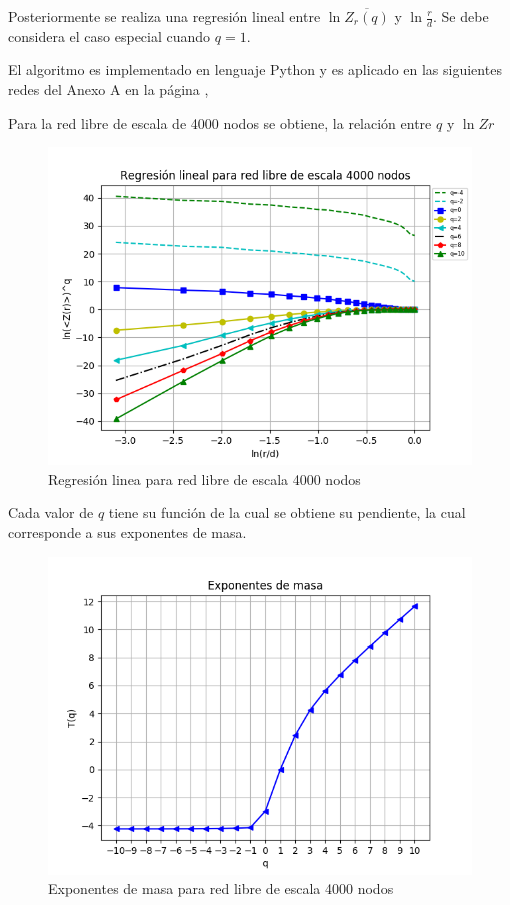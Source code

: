 Posteriormente se realiza una regresión lineal entre $\ln \overline{Z_r(q)}$ y $\ln\frac{r}{d}$. Se debe considera el caso especial cuando $q=1$.

El algoritmo es implementado en lenguaje Python y es aplicado en las siguientes redes del Anexo A en la página \pageref{AnexoA},

Para la red libre de escala de 4000 nodos se obtiene, la relación entre $q$ y $\ln Zr$

\begin{figure}[H]
    \centering
    \includegraphics[scale=0.7]{Capitulo4Multifractalidad/imagenes/scaleFree4000_TqLnrBCscaleFree4000Nodes.png}
    \caption{Regresión linea para red libre de escala 4000 nodos}
\end{figure}

Cada valor de $q$ tiene su función de la cual se obtiene su pendiente, la cual corresponde a sus exponentes de masa.

\begin{figure}[H]
    \centering
    \includegraphics[scale=0.7]{Capitulo4Multifractalidad/imagenes/scaleFree4000_TqscaleFree4000Nodes.png}
    \caption{Exponentes de masa para red libre de escala 4000 nodos}
\end{figure}

